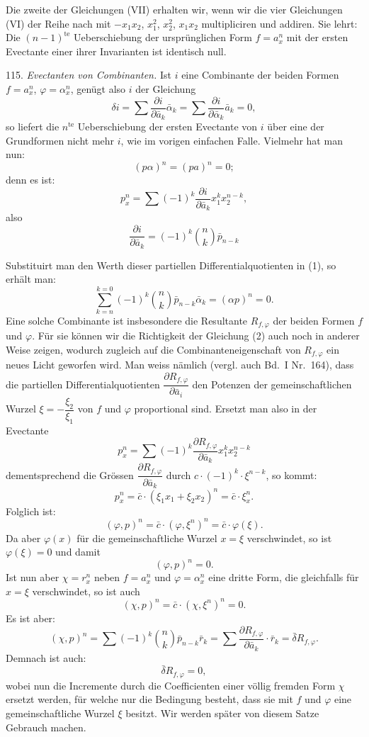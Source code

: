 \documentclass[11pt]{article}
\providecommand{\weberpage}[1]{}
\providecommand{\weq}[2]{\begin{equation}\tag{#1}#2\end{equation}}
\begin{document}
Die zweite der Gleichungen (VII) erhalten wir, wenn wir die vier Gleichungen (VI) der Reihe nach mit $-x_1x_2$, $x_1^2$, $x_2^2$, $x_1x_2$ multipliciren und addiren. Sie lehrt:
\glqq Die $(n-1)^{\text{te}}$ Ueberschiebung der ursprünglichen Form $f=a_x^n$ mit der ersten Evectante einer ihrer Invarianten ist identisch null.\grqq{}

115. \textit{Evectanten von Combinanten.} Ist $i$ eine Combinante der beiden Formen $f=a_x^n$, $\varphi=\alpha_x^n$, genügt also $i$ der Gleichung
\weq{1}{
\delta i = \sum \frac{\partial i}{\partial \bar a_k} \bar\alpha_k = \sum \frac{\partial i}{\partial \bar\alpha_k} \bar a_k = 0,
}
so liefert die $n^{\text{te}}$ Ueberschiebung der ersten Evectante von $i$ über eine der Grundformen nicht mehr $i$, wie im vorigen einfachen Falle. Vielmehr hat man nun:
\weq{2}{
(p\alpha)^n = (pa)^n = 0;
}
denn es ist:
\[
p_x^n = \sum (-1)^k \frac{\partial i}{\partial \bar a_k} x_1^k x_2^{n-k},
\]
also
\[
\frac{\partial i}{\partial \bar a_k} = (-1)^k \binom{n}{k} \bar p_{n-k}
\]


\weberpage{130}
Substituirt man den Werth dieser partiellen Differentialquotienten in (1), so erhält man:
\[
\sum_{k=n}^{k=0} (-1)^k \binom{n}{k} \bar p_{n-k} \bar\alpha_k = (\alpha p)^n = 0.
\]
Eine solche Combinante ist insbesondere die Resultante $R_{f,\varphi}$ der beiden Formen $f$ und $\varphi$. Für sie können wir die Richtigkeit der Gleichung (2) auch noch in anderer Weise zeigen, wodurch zugleich auf die Combinanteneigenschaft von $R_{f,\varphi}$ ein neues Licht geworfen wird. Man weiss nämlich (vergl. auch Bd.~I Nr.~164), dass die partiellen Differentialquotienten $\dfrac{\partial R_{f,\varphi}}{\partial \bar a_i}$ den Potenzen der gemeinschaftlichen Wurzel $\xi = -\dfrac{\xi_2}{\xi_1}$ von $f$ und $\varphi$ proportional sind. Ersetzt man also in der Evectante
\[
p_x^n = \sum (-1)^k \frac{\partial R_{f,\varphi}}{\partial \bar a_k} x_1^k x_2^{n-k}
\]
dementsprechend die Grössen $\dfrac{\partial R_{f,\varphi}}{\partial \bar a_k}$ durch $c\cdot(-1)^k\cdot\xi^{n-k}$, so kommt:
\[
p_x^n = \bar c \cdot (\xi_1 x_1 + \xi_2 x_2)^n = \bar c \cdot \xi_x^n.
\]
Folglich ist:
\[
(\varphi, p)^n = \bar c \cdot (\varphi, \xi^n)^n = \bar c \cdot \varphi(\xi).
\]
Da aber $\varphi(x)$ für die gemeinschaftliche Wurzel $x=\xi$ verschwindet, so ist $\varphi(\xi)=0$ und damit
\[
(\varphi, p)^n = 0.
\]
Ist nun aber $\chi = r_x^n$ neben $f=a_x^n$ und $\varphi=\alpha_x^n$ eine dritte Form, die gleichfalls für $x=\xi$ verschwindet, so ist auch
\[
(\chi, p)^n = \bar c \cdot (\chi, \xi^n)^n = 0.
\]
Es ist aber:
\[
(\chi, p)^n = \sum (-1)^k \binom{n}{k} \bar p_{n-k} \bar r_k = \sum \frac{\partial R_{f,\varphi}}{\partial \bar a_k} \cdot \bar r_k = \bar\delta R_{f,\varphi}.
\]
Demnach ist auch:
\[
\bar\delta R_{f,\varphi} = 0,
\]
wobei nun die Incremente durch die Coefficienten einer völlig fremden Form $\chi$ ersetzt werden, für welche nur die Bedingung besteht, dass sie mit $f$ und $\varphi$ eine gemeinschaftliche Wurzel $\xi$ besitzt. Wir werden später von diesem Satze Gebrauch machen.
\end{document}
